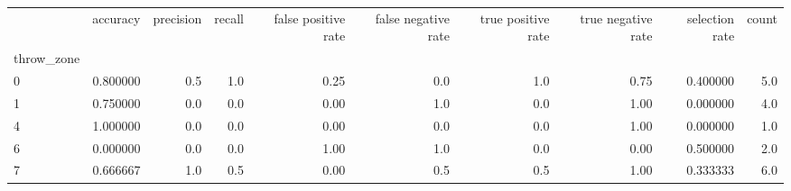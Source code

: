 \begin{tabular}{lrrrrrrrrr}
\toprule
{} &  accuracy &  precision &  recall &  false positive rate &  false negative rate &  true positive rate &  true negative rate &  selection rate &  count \\
throw\_zone &           &            &         &                      &                      &                     &                     &                 &        \\
\midrule
0          &  0.800000 &        0.5 &     1.0 &                 0.25 &                  0.0 &                 1.0 &                0.75 &        0.400000 &    5.0 \\
1          &  0.750000 &        0.0 &     0.0 &                 0.00 &                  1.0 &                 0.0 &                1.00 &        0.000000 &    4.0 \\
4          &  1.000000 &        0.0 &     0.0 &                 0.00 &                  0.0 &                 0.0 &                1.00 &        0.000000 &    1.0 \\
6          &  0.000000 &        0.0 &     0.0 &                 1.00 &                  1.0 &                 0.0 &                0.00 &        0.500000 &    2.0 \\
7          &  0.666667 &        1.0 &     0.5 &                 0.00 &                  0.5 &                 0.5 &                1.00 &        0.333333 &    6.0 \\
\bottomrule
\end{tabular}
